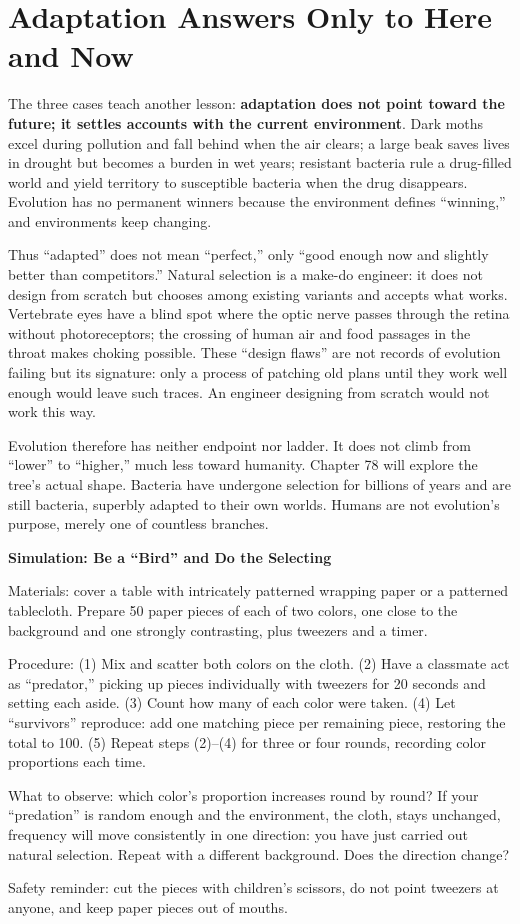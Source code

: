 \section{Adaptation Answers Only to Here and Now}

The three cases teach another lesson: \textbf{adaptation does not point toward the future; it settles accounts with the current environment}. Dark moths excel during pollution and fall behind when the air clears; a large beak saves lives in drought but becomes a burden in wet years; resistant bacteria rule a drug-filled world and yield territory to susceptible bacteria when the drug disappears. Evolution has no permanent winners because the environment defines ``winning,'' and environments keep changing.

Thus ``adapted'' does not mean ``perfect,'' only ``good enough now and slightly better than competitors.'' Natural selection is a make-do engineer: it does not design from scratch but chooses among existing variants and accepts what works. Vertebrate eyes have a blind spot where the optic nerve passes through the retina without photoreceptors; the crossing of human air and food passages in the throat makes choking possible. These ``design flaws'' are not records of evolution failing but its signature: only a process of patching old plans until they work well enough would leave such traces. An engineer designing from scratch would not work this way.

Evolution therefore has neither endpoint nor ladder. It does not climb from ``lower'' to ``higher,'' much less toward humanity. Chapter 78 will explore the tree's actual shape. Bacteria have undergone selection for billions of years and are still bacteria, superbly adapted to their own worlds. Humans are not evolution's purpose, merely one of countless branches.

\begin{shiyan}
\textbf{Simulation: Be a ``Bird'' and Do the Selecting}

Materials: cover a table with intricately patterned wrapping paper or a patterned tablecloth. Prepare 50 paper pieces of each of two colors, one close to the background and one strongly contrasting, plus tweezers and a timer.

Procedure: (1) Mix and scatter both colors on the cloth. (2) Have a classmate act as ``predator,'' picking up pieces individually with tweezers for 20 seconds and setting each aside. (3) Count how many of each color were taken. (4) Let ``survivors'' reproduce: add one matching piece per remaining piece, restoring the total to 100. (5) Repeat steps (2)--(4) for three or four rounds, recording color proportions each time.

What to observe: which color's proportion increases round by round? If your ``predation'' is random enough and the environment, the cloth, stays unchanged, frequency will move consistently in one direction: you have just carried out natural selection. Repeat with a different background. Does the direction change?

Safety reminder: cut the pieces with children's scissors, do not point tweezers at anyone, and keep paper pieces out of mouths.
\end{shiyan}

